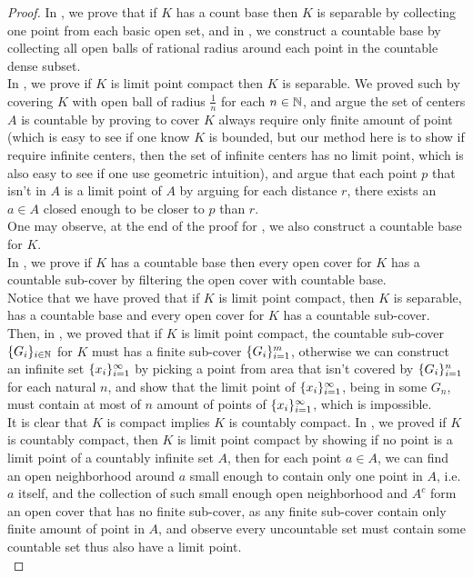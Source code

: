 \documentclass{report}
\begin{document}
\begin{proof}
In , we prove that if $K$ has a count base then $K$ is separable by collecting one point from each basic open set, and in , we construct a countable base by collecting all open balls of rational radius around each point in the countable dense subset.\\

In , we prove if $K$ is limit point compact then  $K$ is separable. We proved such by covering $K$ with open ball of radius $\frac{1}{n}$ for each $n\in\mathbb{N}$, and argue the set of centers $A$ is countable by proving to cover $K$ always require only finite amount of point (which is easy to see if one know $K$ is bounded, but our method here is to show if require infinite centers, then the set of infinite centers has no limit point, which is also easy to see if one use geometric intuition), and argue that each point $p$ that isn't in $A$ is a limit point of $A$ by arguing for each distance $r$, there exists an  $a\in A$ closed enough to be closer to $p$ than $r$.\\

One may observe, at the end of the proof for , we also construct a countable base for $K$.\\

In  , we prove if  $K$ has a countable base then every open cover for  $K$ has a countable sub-cover by filtering the open cover with countable base.\\

Notice that we have proved that if $K$ is limit point compact, then  $K$ is separable, has a countable base and every open cover for  $K$ has a countable sub-cover.\\

Then, in , we proved that if $K$ is limit point compact, the countable sub-cover $\{ G_i \}_{i\in\mathbb{N}}$ for $K$ must has a finite sub-cover $\{ G_i \}_{i=1}^m$, otherwise we can construct an infinite set $\{ x_i \}_{i=1}^\infty$ by picking a point from area that isn't covered by $\{ G_i \}_{i=1}^n$ for each natural $n$, and show that the limit point of $\{ x_i \}_{i=1}^\infty$, being in some $G_n$, must contain at most of  $n$ amount of points of  $\{ x_i \}_{i=1}^\infty$, which is impossible.\\

It is clear that $K$ is compact implies $K$ is countably compact. In  , we proved if $K$ is countably compact, then $K$ is limit point compact by showing if no point is a limit point of a countably infinite set $A$, then for each point $a\in A$, we can find an open neighborhood around $a$ small enough to contain only one point in $A$, i.e.  $a$ itself, and the collection of such small enough open neighborhood and  $A^c$ form an open cover that has no finite sub-cover, as any finite sub-cover contain only finite amount of point in  $A$, and observe every uncountable set must contain some countable set thus also have a limit point.\\


\end{proof}
\end{document}
